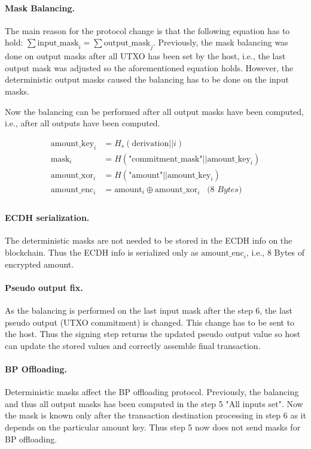 \documentclass[]{article}
\begin{document}
\paragraph{Mask Balancing.}
The main reason for the protocol change is that the following equation has to hold: $\sum \text{input\_mask}_i = \sum \text{output\_mask}_j$.
Previously, the mask balancing was done on output masks after all UTXO has been set by the host, i.e., the last output mask was adjusted so the aforementioned equation holds. However, the deterministic output masks caused the balancing has to be done on the input masks.

Now the balancing can be performed after all output masks have been computed, i.e., after all outputs have been computed.

\begin{equation}
\begin{split} \label{eq:det_mask_hf10_ex}
\text{amount\_key}_i &= H_s(\text{derivation} || i)\\
\text{mask}_i &= H(\text{"commitment\_mask"} || \text{amount\_key}_i)\\
\text{amount\_xor}_i &= H(\text{"amount"} || \text{amount\_key}_i)\\
\text{amount\_enc}_i &= \text{amount}_i \oplus \text{amount\_xor}_i \;\;\; \textit{(8 Bytes)}\\
\end{split}
\end{equation}

\paragraph{ECDH serialization.} The deterministic masks are not needed to be stored in the ECDH info on the blockchain. 
Thus the ECDH info is serialized only as $\text{amount\_enc}_i$, i.e., 8 Bytes of encrypted amount.

\paragraph{Pseudo output fix.}
As the balancing is performed on the last input mask after the step 6, the last pseudo output (UTXO commitment) is changed. This change has to be sent to the host. Thus the signing step returns the updated pseudo output value so host can update the stored values and correctly assemble final transaction.

\paragraph{BP Offloading.}
Deterministic masks affect the BP offloading protocol. Previously, the balancing and thus all output masks has been computed in the step 5 "All inputs set". Now the mask is known only after the transaction destination processing in step 6 as it depends on the particular amount key. Thus step 5 now does not send masks for BP offloading.
\end{document}
